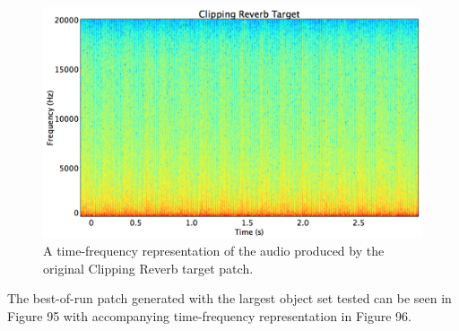 \documentclass[12pt]{report} 	%
\numberwithin{figure}{chapter}
\numberwithin{table}{chapter}
\numberwithin{equation}{chapter}
\begin{document}
\begin{flushleft}
\begin{figure}[h!]
\begin{center}
\includegraphics[scale=0.35,width=\linewidth]{ClippingReverbTargetSTFT}
\caption[Original clipping reverb sawtooth time-frequency representation]{A time-frequency representation of the audio produced by the original Clipping Reverb target patch.}
\end{center}
\end{figure}

The best-of-run patch generated with the largest object set tested can be seen in Figure 95 with accompanying time-frequency representation in Figure 96.


\end{flushleft}
\end{document}
